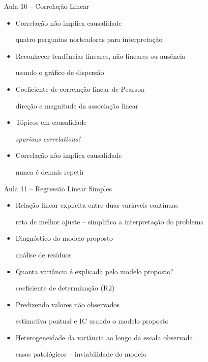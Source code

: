 \documentclass{beamer}
\begin{document}
\begin{frame}{\scriptsize Aula 10 -- Correlação Linear}
  \begin{itemize}
    \footnotesize
  \item Correlação não implica causalidade

    {\tiny quatro perguntas norteadoras para interpretação}
    \bigskip
  \item Reconhecer tendências lineares, não lineares ou ausência

    {\tiny usando o gráfico de dispersão}
    \bigskip
  \item Coeficiente de correlação linear de Pearson

    {\tiny direção e magnitude da associação linear}
    \bigskip
  \item Tópicos em causalidade

    {\tiny \em spurious correlations!}
    \bigskip
  \item Correlação não implica causalidade

    {\tiny nunca é demais repetir}
  \end{itemize}
\end{frame}

\begin{frame}{\scriptsize Aula 11 -- Regressão Linear Simples}
  \begin{itemize}
    \footnotesize
  \item Relação linear explícita entre duas variáveis contínuas

    {\tiny reta de melhor ajuste -- simplifica a interpretação do problema}
    \bigskip
  \item Diagnóstico do modelo proposto

    {\tiny análise de resíduos}
    \bigskip
  \item Quanta variância é explicada pelo modelo proposto?

    {\tiny coeficiente de determinação (R2)}
    \bigskip
  \item Predizendo valores não observados

    {\tiny estimativa pontual e IC usando o modelo proposto}
    \bigskip
  \item Heterogeneidade da variância ao longo da escala observada

    {\tiny casos patológicos -- inviabilidade do modelo}
  \end{itemize}
\end{frame}
\end{document}
